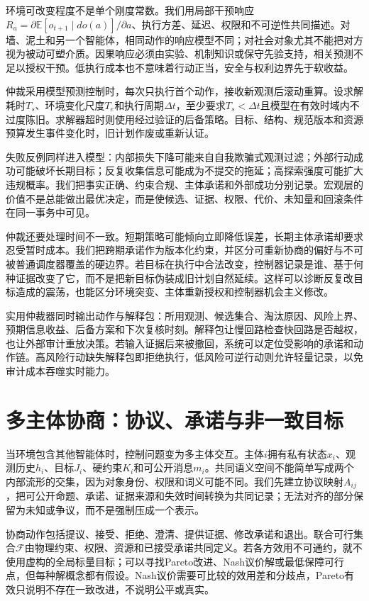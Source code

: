 环境可改变程度不是单个刚度常数。我们用局部干预响应$R_a=\partial\mathbb E[o_{t+1}\mid do(a)]/\partial a$、执行方差、延迟、权限和不可逆性共同描述。对墙、泥土和另一个智能体，相同动作的响应模型不同；对社会对象尤其不能把对方视为被动可塑介质。因果响应必须由实验、机制知识或保守先验支持，相关预测不足以授权干预。低执行成本也不意味着行动正当，安全与权利边界先于软收益。

仲裁采用模型预测控制时，每次只执行首个动作，接收新观测后滚动重算。设求解耗时$T_s$、环境变化尺度$T_e$和执行周期$\Delta t$，至少要求$T_s<\Delta t$且模型在有效时域内不过度陈旧。求解器超时则使用经过验证的后备策略。目标、结构、规范版本和资源预算发生事件变化时，旧计划作废或重新认证。

失败反例同样进入模型：内部损失下降可能来自自我欺骗式观测过滤；外部行动成功可能破坏长期目标；反复收集信息可能成为不提交的拖延；高探索强度可能扩大违规概率。我们把事实正确、约束合规、主体承诺和外部成功分别记录。宏观层的价值不是总能做出最优决定，而是使候选、证据、权限、代价、未知量和回滚条件在同一事务中可见。

仲裁还要处理时间不一致。短期策略可能倾向立即降低误差，长期主体承诺却要求忍受暂时成本。我们把跨期承诺作为版本化约束，并区分可重新协商的偏好与不可被普通调度器覆盖的硬边界。若目标在执行中合法改变，控制器记录是谁、基于何种证据改变了它，而不是把新目标伪装成旧计划自然延续。这样可以诊断反复改目标造成的震荡，也能区分环境突变、主体重新授权和控制器机会主义修改。

实用仲裁器同时输出动作与解释包：所用观测、候选集合、淘汰原因、风险上界、预期信息收益、后备方案和下次复核时刻。解释包让慢回路检查快回路是否越权，也让外部审计重放决策。若输入证据后来被撤回，系统可以定位受影响的承诺和动作链。高风险行动缺失解释包即拒绝执行，低风险可逆行动则允许轻量记录，以免审计成本吞噬实时能力。

\section{多主体协商：协议、承诺与非一致目标}
\label{sec:section_8643}

当环境包含其他智能体时，控制问题变为多主体交互。主体$i$拥有私有状态$x_i$、观测历史$h_i$、目标$J_i$、硬约束$K_i$和可公开消息$m_i$。共同语义空间不能简单写成两个内部流形的交集，因为对象身份、权限和词义可能不同。我们先建立协议映射$A_{ij}$，把可公开命题、承诺、证据来源和失效时间转换为共同记录；无法对齐的部分保留为未知或争议，而不是强制压成一个表示。

协商动作包括提议、接受、拒绝、澄清、提供证据、修改承诺和退出。联合可行集合$\mathcal F$由物理约束、权限、资源和已接受承诺共同定义。若各方效用不可通约，就不使用虚构的全局标量目标；可以寻找Pareto改进、Nash议价解或最低保障可行点，但每种解概念都有假设。Nash议价需要可比较的效用差和分歧点，Pareto有效只说明不存在一致改进，不说明公平或真实。

